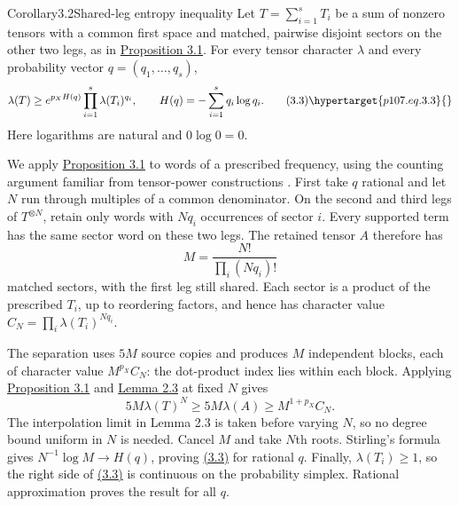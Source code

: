 \begin{result}{Corollary}{3.2}{Shared-leg entropy inequality}
Let $T=\sum_{i=1}^sT_i$ be a sum of nonzero tensors with a common first space and matched, pairwise disjoint sectors on the other two legs, as in \hyperlink{p107.result.3.1}{Proposition 3.1}. For every tensor character $\lambda$ and every probability vector $q=(q_1,\ldots,q_s)$,
\begin{equation}\lambda(T)\ge e^{p_XH(q)}\prod_{i=1}^s\lambda(T_i)^{q_i},\qquad H(q)=-\sum_{i=1}^s q_i\log q_i.\tag{3.3}\hypertarget{p107.eq.3.3}{}\end{equation}
Here logarithms are natural and $0\log0=0$.
\end{result}
\begin{amsthmproof}
We apply \hyperlink{p107.result.3.1}{Proposition 3.1} to words of a prescribed frequency, using the counting argument familiar from tensor-power constructions \cite[Appendix A of the full version]{r10}. First take $q$ rational and let $N$ run through multiples of a common denominator. On the second and third legs of $T^{\otimes N}$, retain only words with $Nq_i$ occurrences of sector $i$. Every supported term has the same sector word on these two legs. The retained tensor $A$ therefore has
\[M=\frac{N!}{\prod_i(Nq_i)!}\]
matched sectors, with the first leg still shared. Each sector is a product of the prescribed $T_i$, up to reordering factors, and hence has character value $C_N=\prod_i\lambda(T_i)^{Nq_i}$.

The separation uses $5M$ source copies and produces $M$ independent blocks, each of character value $M^{p_X}C_N$: the dot-product index lies within each block. Applying \hyperlink{p107.result.3.1}{Proposition 3.1} and \hyperlink{p107.result.2.3}{Lemma 2.3} at fixed $N$ gives
\[5M\lambda(T)^N\ge5M\lambda(A)\ge M^{1+p_X}C_N.\]
The interpolation limit in Lemma 2.3 is taken before varying $N$, so no degree bound uniform in $N$ is needed. Cancel $M$ and take $N$th roots. Stirling's formula gives $N^{-1}\log M\to H(q)$, proving \hyperlink{p107.eq.3.3}{(3.3)} for rational $q$. Finally, $\lambda(T_i)\ge1$, so the right side of \hyperlink{p107.eq.3.3}{(3.3)} is continuous on the probability simplex. Rational approximation proves the result for all $q$.
\end{amsthmproof}
